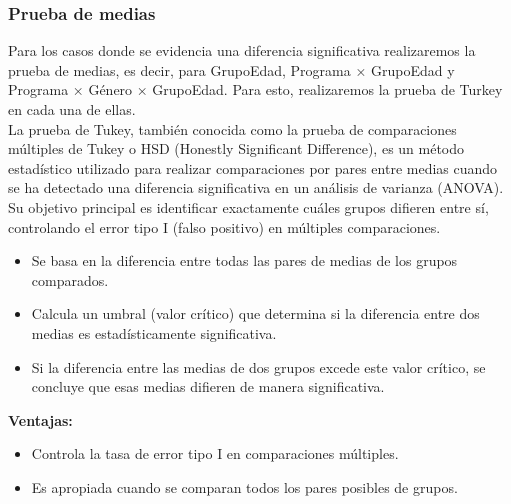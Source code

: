 \documentclass{rapport}
\begin{document}
\subsubsection{Prueba de medias}
Para los casos donde se evidencia una diferencia significativa realizaremos la prueba de medias, es decir, para GrupoEdad, Programa × GrupoEdad y Programa × Género × GrupoEdad. Para esto, realizaremos la prueba de Turkey en cada una de ellas. \\

La prueba de Tukey, también conocida como la prueba de comparaciones múltiples de Tukey o HSD (Honestly Significant Difference), es un método estadístico utilizado para realizar comparaciones por pares entre medias cuando se ha detectado una diferencia significativa en un análisis de varianza (ANOVA). Su objetivo principal es identificar exactamente cuáles grupos difieren entre sí, controlando el error tipo I (falso positivo) en múltiples comparaciones.

\begin{itemize}
    \item[$\diamond$] Se basa en la diferencia entre todas las pares de medias de los grupos comparados.
    \item[$\diamond$] Calcula un umbral (valor crítico) que determina si la diferencia entre dos medias es estadísticamente significativa.
    \item[$\diamond$] Si la diferencia entre las medias de dos grupos excede este valor crítico, se concluye que esas medias difieren de manera significativa.
\end{itemize}

\textbf{Ventajas:}

\begin{itemize}
    \item[$\diamond$] Controla la tasa de error tipo I en comparaciones múltiples.
    \item[$\diamond$] Es apropiada cuando se comparan todos los pares posibles de grupos.
\end{itemize}
\end{document}
